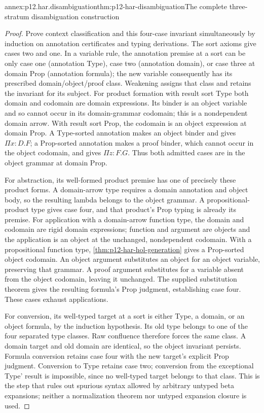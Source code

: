 \begin{annexitem}{annex:p12.har.disambiguation}{thm:p12-har-disambiguation}{The complete three-stratum disambiguation construction}
\begin{proof}
Prove context classification and this four-case invariant simultaneously
by induction on annotation certificates and typing derivations. The sort
axioms give cases two and one. In a variable rule, the annotation premise
at a sort can be only case one (annotation Type), case two (annotation
domain), or case three at domain Prop (annotation formula); the new
variable consequently has its prescribed domain/object/proof class.
Weakening assigns that class and retains the invariant for its subject.
For product formation with result sort Type both domain and codomain
are domain expressions. Its binder is an object variable and so cannot
occur in its domain-grammar codomain; this is a nondependent domain arrow.
With result sort Prop, the codomain is an object expression at domain
Prop. A Type-sorted annotation makes an object binder and gives
\(\Pi x:D.F\); a Prop-sorted annotation makes a proof binder, which
cannot occur in the object codomain, and gives \(\Pi z:F.G\).
Thus both admitted cases are in the object grammar at domain Prop.

For abstraction, its well-formed product premise has one of precisely
these product forms. A domain-arrow type requires a domain annotation
and object body, so the resulting lambda belongs to the object grammar.
A propositional-product type gives case four, and that product's
Prop typing is already its premise. For application with a domain-arrow
function type, the domain and codomain are rigid domain expressions;
function and argument are objects and the application is an object at
the unchanged, nondependent codomain. With a propositional function type,
\cref{thm:p12-har-hol-generation} gives a Prop-sorted object codomain. An object argument substitutes an
object for an object variable, preserving that grammar. A proof argument
substitutes for a variable absent from the object codomain, leaving it
unchanged. The supplied substitution theorem gives the resulting formula's
Prop judgment, establishing case four. These cases exhaust applications.

For conversion, its well-typed target at a sort is either Type, a domain,
or an object formula, by the induction hypothesis. Its old type belongs
to one of the four separated type classes. Raw confluence therefore
forces the same class. A domain target and old domain are identical,
so the object invariant persists. Formula conversion retains case four
with the new target's explicit Prop judgment. Conversion to Type retains
case two; conversion from the exceptional Type' result is impossible,
since no well-typed target belongs to that class. This is the step that
rules out spurious syntax allowed by arbitrary untyped beta expansions;
neither a normalization theorem nor untyped expansion closure is used.


\end{proof}
\end{annexitem}
